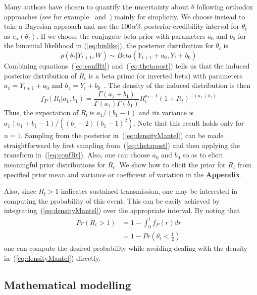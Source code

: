 \documentclass[10pt]{article}
\def \rr {$R_{t}\:$}
\begin{document}
Many authors have chosen to quantify the uncertainty about $\theta$ 
following orthodox approaches  (see for example~\citep{wilson} 
and~\citep{clopper}) mainly for simplicity.
We choose instead to take a Bayesian approach and use the  $100\alpha \%$ 
posterior credibility interval for $\theta_t$ as $c_{\alpha}(\theta_t)$.
If we choose the conjugate beta prior with parameters $a_0$ and $b_0$ for the 
binomial likelihood in (\ref{eq:binlike}), the posterior distribution for 
$\theta_t$ is
\begin{equation}
\label{eq:thetapost}
p(\theta_t| Y_{t+1}, W) \sim Beta(Y_{t+1} + a_0, Y_t + b_0)
\end{equation}
Combining equations~(\ref{eq:confRt}) and~(\ref{eq:thetapost}) 
tells us that the induced posterior distribution of $R_t$ is 
a beta prime (or inverted beta) with parameters $a_1 = Y_{t+1} + a_0$ and $b_1 
=  Y_t + b_0$~\citep{dubey1970}.
The density of the induced distribution is then 
\begin{equation}
\label{eq:densityMantel}
f_P(R_t| a_1, b_1) = \frac{\Gamma(a_1 + b_1)}{\Gamma(a_1)\Gamma(b_1)} R_t^{a_1 
- 
1} (1 + R_t)^{-(a_1 + b_1)}
\end{equation}
Thus, the expectation of \rr is $a_1/(b_1 - 1)$ and its variance is 
$a_1(a_1 + b_1 - 1)/\left((b_1 - 2)(b_1 - 1)^2 \right) $.
Note that this result holds only for $n = 1$.
Sampling from the posterior in~(\ref{eq:densityMantel}) can be made 
straightforward by first sampling from~(\ref{eq:thetapost}) and then applying 
the transform in~(\ref{eq:confRt}).
Also, one can choose $a_0$ and $b_0$ so as to elicit meaningful prior 
distributions for $R_t$.
We show how to elicit the prior for $R_t$ from specified prior mean and variance
or coefficient of variation in the \textbf{Appendix}.

Also, since $R_t > 1$ indicates sustained transmission, one may be 
interested in computing the probability of this event.
This can be easily achieved by integrating~(\ref{eq:densityMantel}) over the 
appropriate interval.
By noting that
\begin{align}
\label{cumprobMantel}
Pr(R_t > 1) &= 1 - \int_0^1 f_P(r)dr \\
            &= 1- Pr(\theta_t < \frac{1}{2})
\end{align}
one can compute the desired probability while avoiding dealing with the density 
in~(\ref{eq:densityMantel}) directly.

\subsection*{Mathematical modelling} %
\end{document}
